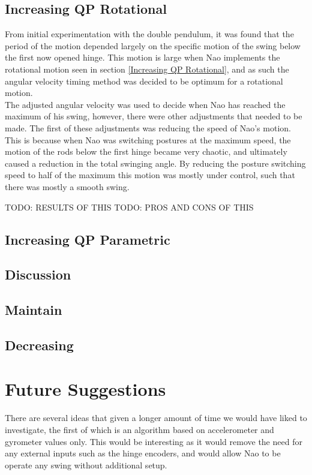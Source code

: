 \documentclass[11pt]{article}
\newcommand*\ruleline[1]{\par\noindent\raisebox{.8ex}{\makebox[\linewidth]{\hrulefill\hspace{1ex}\raisebox{-.8ex}{#1}\hspace{1ex}\hrulefill}}}
\begin{document}
\subsection{Increasing QP Rotational}
From initial experimentation with the double pendulum, it was found that the period of the motion depended largely on the specific motion of the swing below the first now opened hinge. This motion is large when Nao implements the rotational motion seen in section \ref{Increasing QP Rotational}, and as such the angular velocity timing method was decided to be optimum for a rotational motion.\\

The adjusted angular velocity was used to decide when Nao has reached the maximum of his swing, however, there were other adjustments that needed to be made. The first of these adjustments was reducing the speed of Nao's motion. This is because when Nao was switching postures at the maximum speed, the motion of the rods below the first hinge became very chaotic, and ultimately caused a reduction in the total swinging angle. By reducing the posture switching speed to half of the maximum this motion was mostly under control, such that there was mostly a smooth swing.

TODO: RESULTS OF THIS
TODO: PROS AND CONS OF THIS

\subsection{Increasing QP Parametric}



\subsection{Discussion}
\subsection{Maintain}
\subsection{Decreasing}

\section{Future Suggestions}
\ruleline{Code Team}
There are several ideas that given a longer amount of time we would have liked to investigate, the first of which is an algorithm based on accelerometer and gyrometer values only. This would be interesting as it would remove the need for any external inputs such as the hinge encoders, and would allow Nao to be operate any swing without additional setup.
\end{document}

